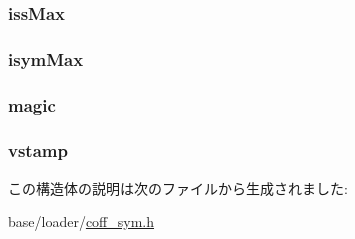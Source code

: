 \label{structecoff__symhdr_a9b259532c92b5c7a93472107d0c6f507}
\hypertarget{structecoff__symhdr_a5637fa1af56ff0c6e719d0e6e4b77457}{
\subsubsection[{issMax}]{ {\bf issMax}}}
\label{structecoff__symhdr_a5637fa1af56ff0c6e719d0e6e4b77457}
\hypertarget{structecoff__symhdr_ae7269aaf3a4d674454f94748a014fe61}{
\subsubsection[{isymMax}]{ {\bf isymMax}}}
\label{structecoff__symhdr_ae7269aaf3a4d674454f94748a014fe61}
\hypertarget{structecoff__symhdr_a805a601a601ae911a002e031aba5a017}{
\subsubsection[{magic}]{ {\bf magic}}}
\label{structecoff__symhdr_a805a601a601ae911a002e031aba5a017}
\hypertarget{structecoff__symhdr_ac5b7916498751eb0e1d3258a379d2dd9}{
\subsubsection[{vstamp}]{ {\bf vstamp}}}
\label{structecoff__symhdr_ac5b7916498751eb0e1d3258a379d2dd9}


この構造体の説明は次のファイルから生成されました:\begin{DoxyCompactItemize}
\item 
base/loader/\hyperlink{coff__sym_8h}{coff\_\-sym.h}\end{DoxyCompactItemize}
